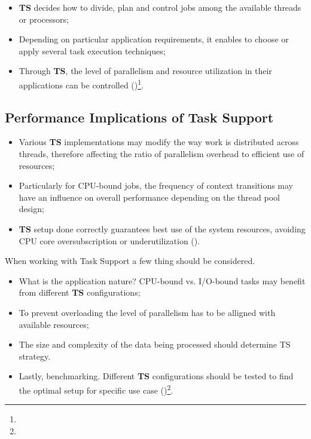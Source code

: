 

\begin{itemize}
    \item \textbf{TS} decides how to divide, plan and control jobs among the available threads or processors;
    \item Depending on particular application requirements, it enables to choose or apply several task execution techniques;
    \item Through \textbf{TS}, the level of parallelism and resource utilization in their applications can be controlled (\cite{task})\footnote[31]{}.
\end{itemize}

\subsection{Performance Implications of Task Support}
\begin{itemize}
    \item Various \textbf{TS} implementations may modify the way work is distributed across threads, therefore affecting the ratio of parallelism overhead to efficient use of resources;
    \item Particularly for CPU-bound jobs, the frequency of context transitions may have an influence on overall performance depending on the thread pool design;
    \item \textbf{TS} setup done correctly guarantees best use of the system resources, avoiding CPU core oversubscription or underutilization (\cite{task})\footnotemark[31].
\end{itemize}



When working with Task Support a few thing should be considered.
\begin{itemize}
    \item What is the application nature? CPU-bound vs. I/O-bound tasks may benefit from different \textbf{TS} configurations;
    \item To prevent overloading the level of parallelism has to be alligned with available resources;
    \item The size and complexity of the data being processed should determine TS strategy.
    \item Lastly, benchmarking. Different \textbf{TS} configurations should be tested to find the optimal setup for specific use case (\cite{task})\footnote[31]{}.
\end{itemize}


